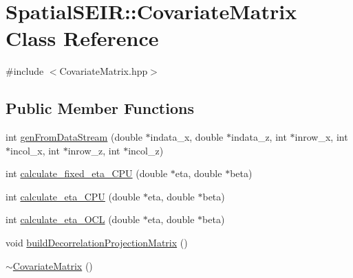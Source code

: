 \hypertarget{classSpatialSEIR_1_1CovariateMatrix}{\section{Spatial\-S\-E\-I\-R\-:\-:Covariate\-Matrix Class Reference}
\label{classSpatialSEIR_1_1CovariateMatrix}
}


{\ttfamily \#include $<$Covariate\-Matrix.\-hpp$>$}

\subsection*{Public Member Functions}
\begin{DoxyCompactItemize}
\item 
int \hyperlink{classSpatialSEIR_1_1CovariateMatrix_a6d01e75564364a8f3356c3cee02bf43d}{gen\-From\-Data\-Stream} (double $\ast$indata\-\_\-x, double $\ast$indata\-\_\-z, int $\ast$inrow\-\_\-x, int $\ast$incol\-\_\-x, int $\ast$inrow\-\_\-z, int $\ast$incol\-\_\-z)
\item 
int \hyperlink{classSpatialSEIR_1_1CovariateMatrix_a385a3e444e0e92993db6d50440a1c254}{calculate\-\_\-fixed\-\_\-eta\-\_\-\-C\-P\-U} (double $\ast$eta, double $\ast$beta)
\item 
int \hyperlink{classSpatialSEIR_1_1CovariateMatrix_ad99c3e064edae9c73aa30b5f68628c15}{calculate\-\_\-eta\-\_\-\-C\-P\-U} (double $\ast$eta, double $\ast$beta)
\item 
int \hyperlink{classSpatialSEIR_1_1CovariateMatrix_af9eed26337877e698c4077c2548aedd3}{calculate\-\_\-eta\-\_\-\-O\-C\-L} (double $\ast$eta, double $\ast$beta)
\item 
void \hyperlink{classSpatialSEIR_1_1CovariateMatrix_a094a15fd40f4a6920c3df909b11761f6}{build\-Decorrelation\-Projection\-Matrix} ()
\item 
\hyperlink{classSpatialSEIR_1_1CovariateMatrix_a249c8173d32d887ee3beb492e8f9dad1}{$\sim$\-Covariate\-Matrix} ()
\end{DoxyCompactItemize}
